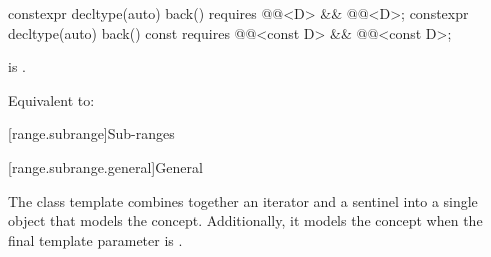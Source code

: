 %
\begin{itemdecl}
constexpr decltype(auto) back() requires @@<D> && @@<D>;
constexpr decltype(auto) back() const
  requires @@<const D> && @@<const D>;
\end{itemdecl}

\begin{itemdescr}
\pnum
\expects
{} is .

\pnum
\effects
Equivalent to: 
\end{itemdescr}

[range.subrange]{Sub-ranges}

[range.subrange.general]{General}

\pnum
The  class template combines together an
iterator and a sentinel into a single object that models the
 concept. Additionally, it models the
 concept when the final template parameter is
.

